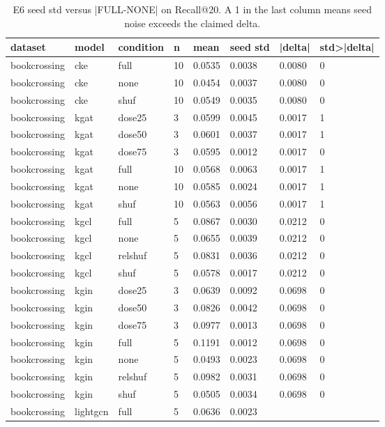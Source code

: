 \begin{table}[t]
\centering
\caption{E6 seed std versus |FULL-NONE| on Recall@20. A 1 in the last column means seed noise exceeds the claimed delta.}
\label{tab:e6}
\begin{tabular}{llllllll}
\hline
dataset & model & condition & n & mean & seed std & |delta| & std>|delta| \\
\hline
bookcrossing & cke & full & 10 & 0.0535 & 0.0038 & 0.0080 & 0 \\
bookcrossing & cke & none & 10 & 0.0454 & 0.0037 & 0.0080 & 0 \\
bookcrossing & cke & shuf & 10 & 0.0549 & 0.0035 & 0.0080 & 0 \\
bookcrossing & kgat & dose25 & 3 & 0.0599 & 0.0045 & 0.0017 & 1 \\
bookcrossing & kgat & dose50 & 3 & 0.0601 & 0.0037 & 0.0017 & 1 \\
bookcrossing & kgat & dose75 & 3 & 0.0595 & 0.0012 & 0.0017 & 0 \\
bookcrossing & kgat & full & 10 & 0.0568 & 0.0063 & 0.0017 & 1 \\
bookcrossing & kgat & none & 10 & 0.0585 & 0.0024 & 0.0017 & 1 \\
bookcrossing & kgat & shuf & 10 & 0.0563 & 0.0056 & 0.0017 & 1 \\
bookcrossing & kgcl & full & 5 & 0.0867 & 0.0030 & 0.0212 & 0 \\
bookcrossing & kgcl & none & 5 & 0.0655 & 0.0039 & 0.0212 & 0 \\
bookcrossing & kgcl & relshuf & 5 & 0.0831 & 0.0036 & 0.0212 & 0 \\
bookcrossing & kgcl & shuf & 5 & 0.0578 & 0.0017 & 0.0212 & 0 \\
bookcrossing & kgin & dose25 & 3 & 0.0639 & 0.0092 & 0.0698 & 0 \\
bookcrossing & kgin & dose50 & 3 & 0.0826 & 0.0042 & 0.0698 & 0 \\
bookcrossing & kgin & dose75 & 3 & 0.0977 & 0.0013 & 0.0698 & 0 \\
bookcrossing & kgin & full & 5 & 0.1191 & 0.0012 & 0.0698 & 0 \\
bookcrossing & kgin & none & 5 & 0.0493 & 0.0023 & 0.0698 & 0 \\
bookcrossing & kgin & relshuf & 5 & 0.0982 & 0.0031 & 0.0698 & 0 \\
bookcrossing & kgin & shuf & 5 & 0.0505 & 0.0034 & 0.0698 & 0 \\
bookcrossing & lightgcn & full & 5 & 0.0636 & 0.0023 &  &  \\

\end{tabular}
\end{table}
